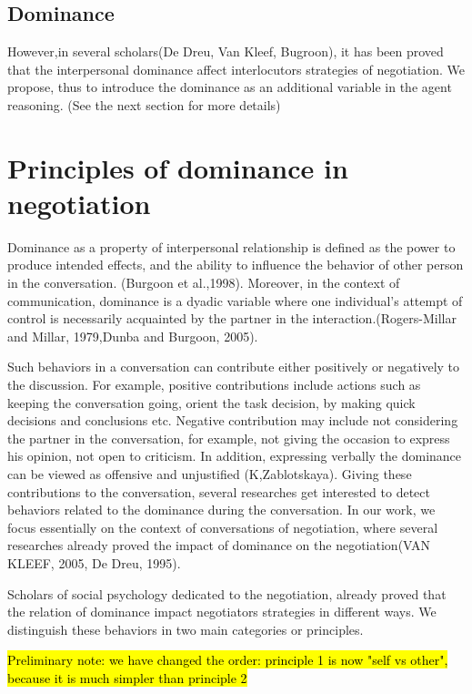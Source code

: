 \documentclass{article}
\begin{document}
\subsection{Dominance}

However,in several scholars(De Dreu, Van Kleef, Bugroon), it has been proved that the interpersonal dominance affect interlocutors strategies of negotiation. We propose, thus to introduce the dominance as an additional variable in the agent reasoning. (See the next section for more details)


\section{Principles of dominance in negotiation}
\par Dominance as a property of interpersonal relationship is defined as the power to produce intended effects, and the ability to influence the behavior of other person in the conversation. (Burgoon et al.,1998).
Moreover, in the context of communication, dominance is a dyadic variable where one individual's attempt of control is necessarily acquainted by the partner in the interaction.(Rogers-Millar and Millar, 1979,Dunba and Burgoon, 2005). 

\par Such behaviors in a conversation can contribute either positively or negatively to the discussion. For example, positive contributions include actions such as keeping the conversation going, orient the task decision, by making quick decisions and conclusions etc. Negative contribution may include not considering the partner in the conversation, for example, not giving the occasion to express his opinion, not open to criticism. In addition, expressing verbally the dominance can be viewed as offensive and unjustified (K,Zablotskaya). Giving these contributions to the conversation, several researches get interested to detect  behaviors related to the dominance during the conversation. In our work, we focus essentially on the context of conversations of negotiation, where several researches already proved the impact of dominance on the negotiation(VAN KLEEF, 2005, De Dreu, 1995). 

\par Scholars of social psychology dedicated to the negotiation, already proved that the relation of dominance impact negotiators strategies in different ways. We distinguish these behaviors in two main categories or principles.

\hl{Preliminary note: we have changed the order: principle 1 is now "self vs other", because it is much simpler than principle 2}
\end{document}
